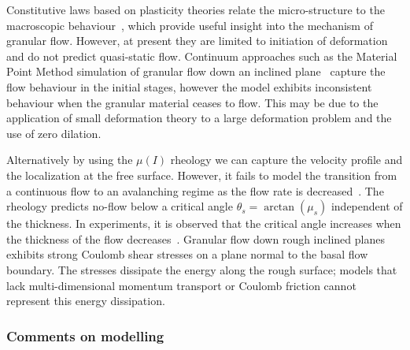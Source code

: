 Constitutive laws based on plasticity theories relate the micro-structure to 
the macroscopic behaviour~\citep{Roux2002}, which provide useful insight into 
the mechanism of granular flow. However, at present they are limited to 
initiation of deformation and do not predict quasi-static flow. Continuum 
approaches such as the Material Point Method simulation of granular flow down 
an inclined plane~\citep{Abe2006,Bandara2013} capture the flow behaviour in 
the initial stages, however the model exhibits inconsistent behaviour when the 
granular material ceases to flow. This may be due to the application of small 
deformation theory to a large deformation problem and the use of zero dilation. 

Alternatively by using the $\mu(\textit{I})$ rheology we can capture the 
velocity profile and the localization at the free surface. However, it fails to 
model the transition from a continuous flow to an avalanching regime as the 
flow rate is decreased~\citep{Pouliquen2006}. The rheology predicts no-flow 
below a critical angle $\theta_s = \arctan(\mu_s)$ independent of the 
thickness. In experiments, it is observed that the critical angle increases 
when the thickness of the flow decreases~\citep{Pouliquen1999}. Granular 
flow down rough inclined planes exhibits strong Coulomb shear stresses on a 
plane normal to the basal flow boundary. The stresses dissipate the energy 
along the rough surface; models that lack multi-dimensional momentum transport 
or Coulomb friction cannot represent this energy dissipation.

\subsubsection{Comments on modelling}

